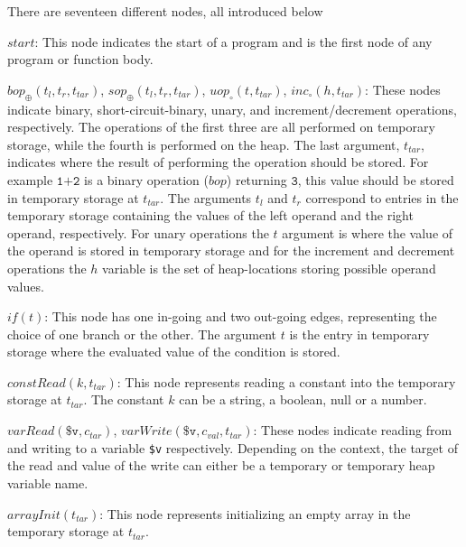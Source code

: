 There are seventeen different nodes, all introduced below
\begin{description}
\item{$\mathit{start}$:} This node indicates the start of a program and is the first node of any program or function body. 
\item{$\mathit{bop_{\oplus}}(t_l,t_r, t_{tar})$, $\mathit{sop_{\oplus}}(t_l,t_r, t_{tar})$, $\mathit{uop_{\circ}}(t, t_{tar})$, $\mathit{inc_{\circ}}(h, t_{tar})$:} These nodes indicate binary, short-circuit-binary, unary, and increment/decrement operations, respectively. The operations of the first three are all performed on temporary storage, while the fourth is performed on the heap. The last argument, $t_{tar}$, indicates where the result of performing the operation should be stored. For example $\texttt{1+2}$ is a binary operation ($\mathit{bop}$) returning $\texttt{3}$, this value should be stored in temporary storage at $t_{tar}$. The arguments $t_l$ and $t_r$ correspond to entries in the temporary storage containing the values of the left operand and the right operand, respectively. For unary operations the $t$ argument is where the value of the operand is stored in temporary storage and for the increment and decrement operations the $h$ variable is the set of heap-locations storing possible operand values.
\item{$\mathit{if}(t)$:} This node has one in-going and two out-going edges, representing the choice of one branch or the other. The argument $t$ is the entry in temporary storage where the evaluated value of the condition is stored.
\item{$\mathit{constRead}(k, t_{tar})$:} This node represents reading a constant into the temporary storage at $t_{tar}$. The constant $k$ can be a string, a boolean, null or a number.
\item{$\mathit{varRead}(\texttt{\$v}, c_{tar})$, $\mathit{varWrite}(\texttt{\$v}, c_{val}, t_{tar})$:} These nodes indicate reading from and writing to a variable \texttt{\$v} respectively. Depending on the context, the target of the read and value of the write can either be a temporary or temporary heap variable name. 
\item{$\mathit{arrayInit}(t_{tar})$:} This node represents initializing an empty array in the temporary storage at $t_{tar}$.

\end{description}
